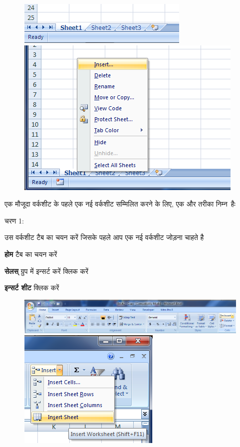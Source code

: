 \begin{figure}[H]
\centering
\includegraphics[scale=0.4]{src/images/chapter1/chapter1_fig13.png}
\includegraphics[scale=0.4]{src/images/chapter1/chapter1_fig14.png}
\end{figure}

एक मौजूदा वर्कशीट के पहले एक नई वर्कशीट सम्मिलित करने के लिए, एक और तरीका निम्न~हैः
\begin{descriptionSimple}{चरण 1:}
\item[चरण 1] उस वर्कशीट टैब का चयन करें जिसके पहले आप एक नई वर्कशीट जोड़ना चाहते है
\item[चरण 2] \textbf{होम} टैब का चयन करें
\item[चरण 3] \textbf{सेलस्} ग्रुप में इन्सर्ट करें क्लिक करें
\item[चरण 4] \textbf{इन्सर्ट शीट} क्लिक करें
\end{descriptionSimple}

\begin{figure}[H]
\centering
\includegraphics[scale=0.43]{src/images/chapter1/chapter1_fig15.png}\\[5pt]
\includegraphics[scale=0.55]{src/images/chapter1/chapter1_fig16.png}
\end{figure}

